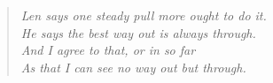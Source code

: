 \clearpage
\vspace*{7cm}
\thispagestyle{empty} 

\begin{verse}
\itshape
Len says one steady pull more ought to do it.\\
He says the best way out is always through.\\
And I agree to that, or in so far\\
As that I can see no way out but through.\\
\end{verse}
